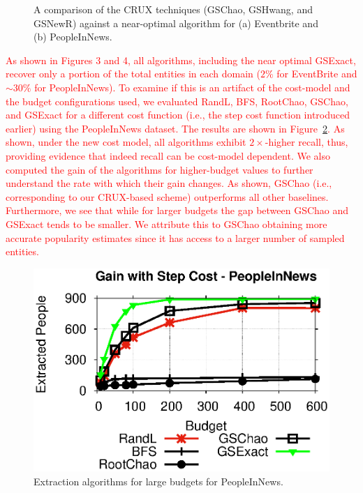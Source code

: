 \begin{figure}
\begin{center}
\end{center}
\caption{A comparison of the CRUX techniques (GSChao, GSHwang, and GSNewR) against a near-optimal algorithm for (a) Eventbrite and (b) PeopleInNews.}
\label{fig:resultsextr}
\vspace{-10pt}
\end{figure} 

\textcolor{red}{
As shown in Figures 3 and 4, all algorithms, including the near optimal GSExact, recover only a portion of the total entities in each domain ($2\%$ for EventBrite and $\sim30\%$ for PeopleInNews). To examine if this is an artifact of the cost-model and the budget configurations used, we evaluated RandL, BFS, RootChao, GSChao, and GSExact for a different cost function (i.e., the step cost function introduced earlier) using the PeopleInNews dataset. The results are shown in Figure~\ref{fig:budget}. As shown, under the new cost model, all algorithms exhibit $2\times$-higher recall, thus, providing evidence that indeed recall can be cost-model dependent. We also computed the gain of the algorithms for higher-budget values to further understand the rate with which their gain changes. As shown, GSChao (i.e., corresponding to our CRUX-based scheme) outperforms all other baselines. Furthermore, we see that while for larger budgets the gap between GSChao and GSExact tends to be smaller. We attribute this to GSChao obtaining more accurate popularity estimates since it has access to a larger number of sampled entities.}

\begin{figure}[t]
    \begin{center}
    \includegraphics[scale=0.42]{figs/budget.eps}
	\caption{Extraction algorithms for large budgets for PeopleInNews.}\label{fig:budget}
	\end{center}
\end{figure}


